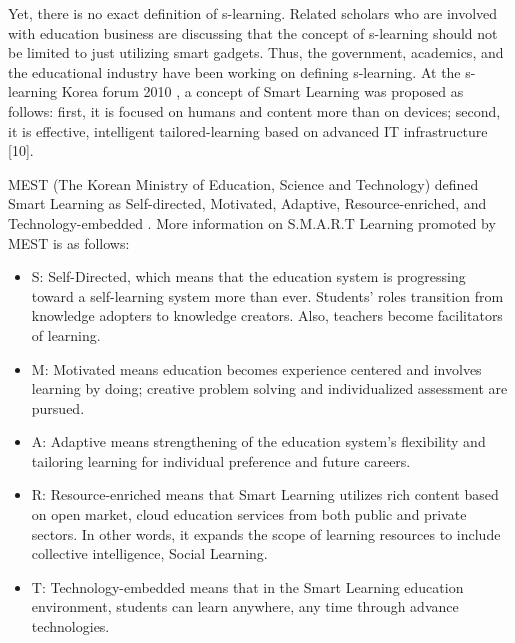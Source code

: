 \documentclass[journal]{vgtc}
\begin{document}
Yet, there is no exact definition of s-learning. Related scholars who are involved with education business are discussing that the concept of s-learning should not be limited to just utilizing smart gadgets. Thus, the government, academics, and the educational industry have been working on defining s-learning. At the s-learning Korea forum 2010 \cite{Kim2013a}, a concept of Smart Learning was proposed as follows: first, it is focused on humans and content more than on devices; second, it is effective, intelligent tailored-learning based on advanced IT infrastructure [10].

MEST (The Korean Ministry of Education, Science and Technology) defined Smart Learning as Self-directed, Motivated, Adaptive, Resource-enriched, and Technology-embedded \cite{mest}. More information on S.M.A.R.T Learning promoted by MEST is as follows:
\begin{itemize}
  \setlength\itemsep{-0.5em}
  \item S: Self-Directed, which means that the education system is progressing toward a self-learning system more than ever. Students' roles transition from knowledge adopters to knowledge creators. Also, teachers become facilitators of learning.
  \item M: Motivated means education becomes experience centered and involves learning by doing; creative problem solving and individualized assessment are pursued.
  \item A: Adaptive means strengthening of the education system's flexibility and tailoring learning for individual preference and future careers.
  \item R: Resource-enriched means that Smart Learning utilizes rich content based on open market, cloud education services from both public and private sectors. In other words, it expands the scope of learning resources to include collective intelligence, Social Learning.
  \item T: Technology-embedded means that in the Smart Learning education environment, students can learn anywhere, any time through advance technologies.
\end{itemize}
\end{document}
